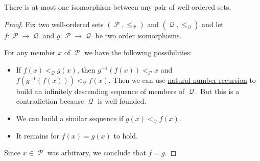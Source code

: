 \begin{proposition}\label{thm:well_ordered_isomorphism_is_unique}
  There is at most one isomorphism between any pair of well-ordered sets.
\end{proposition}
\begin{proof}
  Fix two well-ordered sets \( (\mscrP, \leq_\mscrP) \) and \( (\mscrQ, \leq_\mscrQ) \) and let \( f: \mscrP \to \mscrQ \) and \( g: \mscrP \to \mscrQ \) be two order isomorphisms.

  For any member \( x \) of \( \mscrP \) we have the following possibilities:
  \begin{itemize}
    \item If \( f(x) <_\mscrQ g(x) \), then \( g^{-1}(f(x)) <_\mscrP x \) and \( f(g^{-1}(f(x))) <_\mscrQ f(x) \). Then we can use \hyperref[rem:natural_number_recursion]{natural number recursion} to build an infinitely descending sequence of members of \( \mscrQ \). But this is a contradiction because \( \mscrQ \) is well-founded.

    \item We can build a similar sequence if \( g(x) <_\mscrQ f(x) \).

    \item It remains for \( f(x) = g(x) \) to hold.
  \end{itemize}

  Since \( x \in \mscrP \) was arbitrary, we conclude that \( f = g \).
\end{proof}


